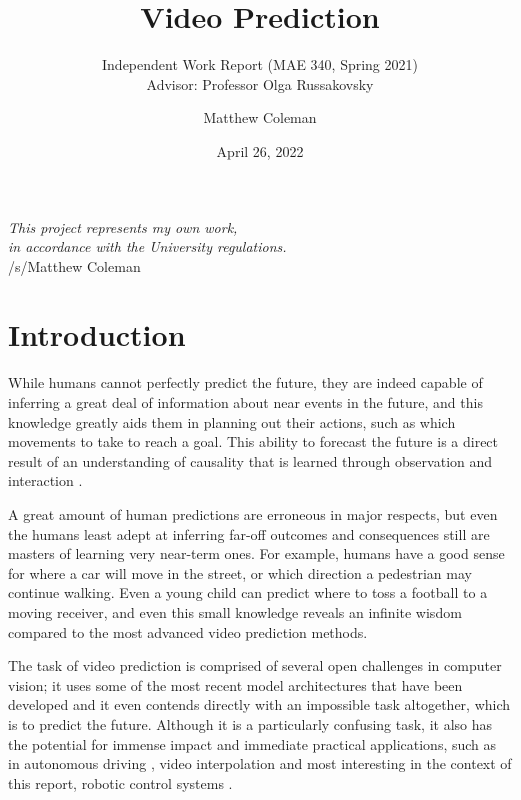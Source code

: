 \documentclass{scrartcl}
\title{Video Prediction}
\subtitle{Independent Work Report (MAE 340, Spring 2021) \\ Advisor: Professor Olga Russakovsky}
\author{Matthew Coleman}
\date{April 26, 2022}
\begin{document}
\maketitle

\vspace{8cm}
\begin{center}
	\Large \textit{This project represents my own work, \\ in accordance with the University regulations.} \\
	\vspace{0.2cm}
	\large /s/Matthew Coleman
\end{center}
\normalsize

\newpage
\tableofcontents
\newpage

\section{Introduction}
\label{sec:intro}

While humans cannot perfectly predict the future, they are indeed capable of
inferring a great deal of information about near events in the future, and this
knowledge greatly aids them in planning out their actions, such as which
movements to take to reach a goal. This ability to forecast the future is a
direct result of an understanding of causality that is learned through
observation and interaction \cite{human_learning_sequences}.

A great amount of human predictions are erroneous in major respects, but even
the humans least adept at inferring far-off outcomes and consequences still are
masters of learning very near-term ones. For example, humans have a good sense
for where a car will move in the street, or which direction a pedestrian may
continue walking. Even a young child can predict where to toss a football to a
moving receiver, and even this small knowledge reveals an infinite wisdom
compared to the most advanced video prediction methods.

The task of video prediction is comprised of several open challenges in
computer vision; it uses some of the most recent model architectures that have
been developed and it even contends directly with an impossible task
altogether, which is to predict the future. Although it is a particularly
confusing task, it also has the potential for immense impact and immediate
practical applications, such as in autonomous driving \cite{eg_self_driving},
video interpolation \cite{eg_video_interp} and most interesting in the context
of this report, robotic control systems \cite{eg_robot_control}.
\end{document}
